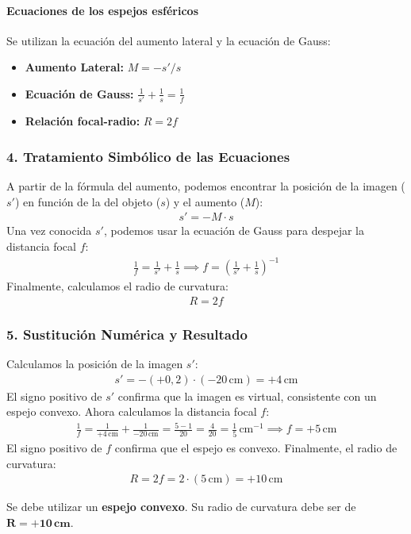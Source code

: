 \paragraph*{Ecuaciones de los espejos esféricos}
Se utilizan la ecuación del aumento lateral y la ecuación de Gauss:
\begin{itemize}
    \item \textbf{Aumento Lateral:} $M = -s'/s$
    \item \textbf{Ecuación de Gauss:} $\frac{1}{s'} + \frac{1}{s} = \frac{1}{f}$
    \item \textbf{Relación focal-radio:} $R = 2f$
\end{itemize}

\subsubsection*{4. Tratamiento Simbólico de las Ecuaciones}
A partir de la fórmula del aumento, podemos encontrar la posición de la imagen ($s'$) en función de la del objeto ($s$) y el aumento ($M$):
\begin{gather}
    s' = -M \cdot s
\end{gather}
Una vez conocida $s'$, podemos usar la ecuación de Gauss para despejar la distancia focal $f$:
\begin{gather}
    \frac{1}{f} = \frac{1}{s'} + \frac{1}{s} \implies f = \left( \frac{1}{s'} + \frac{1}{s} \right)^{-1}
\end{gather}
Finalmente, calculamos el radio de curvatura:
\begin{gather}
    R = 2f
\end{gather}

\subsubsection*{5. Sustitución Numérica y Resultado}
Calculamos la posición de la imagen $s'$:
\begin{gather}
    s' = -(+0,2) \cdot (-20 \, \text{cm}) = +4 \, \text{cm}
\end{gather}
El signo positivo de $s'$ confirma que la imagen es virtual, consistente con un espejo convexo. Ahora calculamos la distancia focal $f$:
\begin{gather}
    \frac{1}{f} = \frac{1}{+4 \, \text{cm}} + \frac{1}{-20 \, \text{cm}} = \frac{5-1}{20} = \frac{4}{20} = \frac{1}{5} \, \text{cm}^{-1} \implies f = +5 \, \text{cm}
\end{gather}
El signo positivo de $f$ confirma que el espejo es convexo. Finalmente, el radio de curvatura:
\begin{gather}
    R = 2f = 2 \cdot (5 \, \text{cm}) = +10 \, \text{cm}
\end{gather}
\begin{cajaresultado}
    Se debe utilizar un \textbf{espejo convexo}. Su radio de curvatura debe ser de $\boldsymbol{R = +10 \, \textbf{cm}}$.
\end{cajaresultado}

